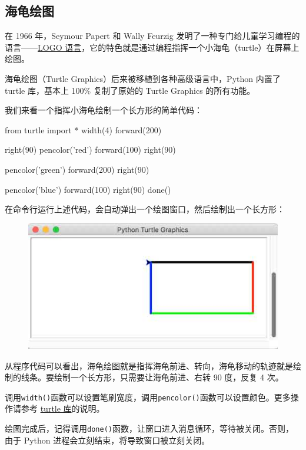 \hypertarget{ux6d77ux9f9fux7ed8ux56fe}{%
\subsection{海龟绘图}\label{ux6d77ux9f9fux7ed8ux56fe}}

在 1966 年，Seymour Papert 和 Wally Feurzig
发明了一种专门给儿童学习编程的语言------\href{https://baike.baidu.com/item/logo/4689862}{LOGO
语言}，它的特色就是通过编程指挥一个小海龟（turtle）在屏幕上绘图。

海龟绘图（Turtle Graphics）后来被移植到各种高级语言中，Python 内置了
turtle 库，基本上 100\% 复制了原始的 Turtle Graphics 的所有功能。

我们来看一个指挥小海龟绘制一个长方形的简单代码：

\begin{pythoncode}
from turtle import *
width(4)
forward(200)

right(90)
pencolor('red')
forward(100)
right(90)

pencolor('green')
forward(200)
right(90)

pencolor('blue')
forward(100)
right(90)
done()
\end{pythoncode}

在命令行运行上述代码，会自动弹出一个绘图窗口，然后绘制出一个长方形：

 
 \begin{figure}[htp]
	\centering
	\includegraphics[width=0.6\linewidth]{fig/1249598058265600l.png}
\end{figure}


从程序代码可以看出，海龟绘图就是指挥海龟前进、转向，海龟移动的轨迹就是绘制的线条。要绘制一个长方形，只需要让海龟前进、右转
90 度，反复 4 次。

调用\texttt{width()}函数可以设置笔刷宽度，调用\texttt{pencolor()}函数可以设置颜色。更多操作请参考
\href{https://docs.python.org/3.3/library/turtle.html\#turtle-methods}{turtle
库}的说明。

绘图完成后，记得调用\texttt{done()}函数，让窗口进入消息循环，等待被关闭。否则，由于
Python 进程会立刻结束，将导致窗口被立刻关闭。

